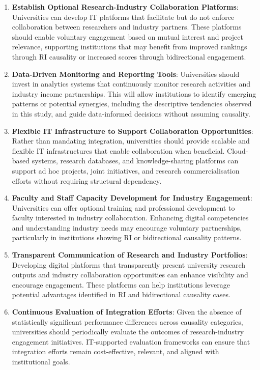 \documentclass[a4paper, conference]{IEEEtran}
\begin{document}
\begin{enumerate}
	\item \textbf{Establish Optional Research-Industry Collaboration Platforms}: Universities can develop IT platforms that facilitate but do not enforce collaboration between researchers and industry partners. These platforms should enable voluntary engagement based on mutual interest and project relevance, supporting institutions that may benefit from improved rankings through RI causality or increased scores through bidirectional engagement.
	
	\item \textbf{Data-Driven Monitoring and Reporting Tools}: Universities should invest in analytics systems that continuously monitor research activities and industry income partnerships. This will allow institutions to identify emerging patterns or potential synergies, including the descriptive tendencies observed in this study, and guide data-informed decisions without assuming causality.
	
	\item \textbf{Flexible IT Infrastructure to Support Collaboration Opportunities}: Rather than mandating integration, universities should provide scalable and flexible IT infrastructures that enable collaboration when beneficial. Cloud-based systems, research databases, and knowledge-sharing platforms can support ad hoc projects, joint initiatives, and research commercialisation efforts without requiring structural dependency.
	
	\item \textbf{Faculty and Staff Capacity Development for Industry Engagement}: Universities can offer optional training and professional development to faculty interested in industry collaboration. Enhancing digital competencies and understanding industry needs may encourage voluntary partnerships, particularly in institutions showing RI or bidirectional causality patterns.
	
	\item \textbf{Transparent Communication of Research and Industry Portfolios}: Developing digital platforms that transparently present university research outputs and industry collaboration opportunities can enhance visibility and encourage engagement. These platforms can help institutions leverage potential advantages identified in RI and bidirectional causality cases.
	
	\item \textbf{Continuous Evaluation of Integration Efforts}: Given the absence of statistically significant performance differences across causality categories, universities should periodically evaluate the outcomes of research-industry engagement initiatives. IT-supported evaluation frameworks can ensure that integration efforts remain cost-effective, relevant, and aligned with institutional goals.
	

\end{enumerate}
\end{document}
